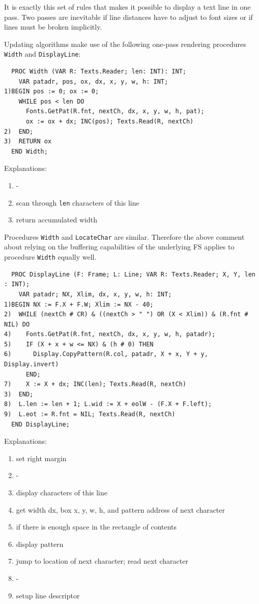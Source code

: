 It is exactly this set of rules that makes it possible to display a text line in one pass. Two passes
are inevitable if line distances have to adjust to font sizes or if lines must be broken implicitly.

Updating algorithms make use of the following one-pass rendering procedures \verb|Width| and \verb|DisplayLine|:

\begin{verbatim}
  PROC Width (VAR R: Texts.Reader; len: INT): INT;
    VAR patadr, pos, ox, dx, x, y, w, h: INT;
1)BEGIN pos := 0; ox := 0;
    WHILE pos < len DO
      Fonts.GetPat(R.fnt, nextCh, dx, x, y, w, h, pat);
      ox := ox + dx; INC(pos); Texts.Read(R, nextCh)
2)  END;
3)  RETURN ox
  END Width;
\end{verbatim}

Explanations:
\begin{enumerate}
  \item -
  \item scan through \verb|len| characters of this line
  \item return accumulated width
\end{enumerate}

Procedures \verb|Width| and \verb|LocateChar| are similar. Therefore the above comment about relying
on the buffering capabilities of the underlying FS applies to procedure \verb|Width| equally well.
\begin{verbatim}
  PROC DisplayLine (F: Frame; L: Line; VAR R: Texts.Reader; X, Y, len : INT);
    VAR patadr; NX, Xlim, dx, x, y, w, h: INT;
1)BEGIN NX := F.X + F.W; Xlim := NX - 40;
2)  WHILE (nextCh # CR) & ((nextCh > " ") OR (X < Xlim)) & (R.fnt # NIL) DO
4)    Fonts.GetPat(R.fnt, nextCh, dx, x, y, w, h, patadr);
5)    IF (X + x + w <= NX) & (h # 0) THEN
6)      Display.CopyPattern(R.col, patadr, X + x, Y + y, Display.invert)
      END;
7)    X := X + dx; INC(len); Texts.Read(R, nextCh)
3)  END;
8)  L.len := len + 1; L.wid := X + eolW - (F.X + F.left);
9)  L.eot := R.fnt = NIL; Texts.Read(R, nextCh)
  END DisplayLine;
\end{verbatim}

Explanations:
\begin{enumerate}
  \item set right margin
  \item -
  \item display characters of this line
  \item get width dx, box x, y, w, h, and pattern address of next character
  \item if there is enough space in the rectangle of contents
  \item display pattern
  \item jump to location of next character; read next character
  \item -
  \item setup line descriptor
\end{enumerate}

